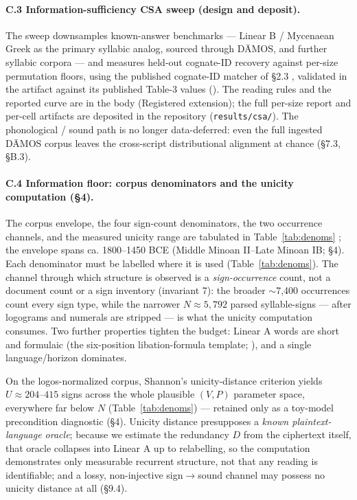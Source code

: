 \paragraph{C.3 Information-sufficiency CSA sweep (design and deposit).}
The sweep downsamples known-answer benchmarks --- Linear B /
Mycenaean Greek as the primary syllabic analog, sourced through D\=AMOS,
and further syllabic corpora --- and measures held-out cognate-ID
recovery against per-size permutation floors, using the published
cognate-ID matcher of \S2.3 \citep{tamburini2025}, validated in the
artifact against its published Table-3 values (\artref). The reading
rules and the reported curve are in the body (Registered extension); the
full per-size report and per-cell artifacts are deposited in the
repository (\texttt{results/csa/}).
The phonological / sound path is no longer data-deferred: even the full
ingested D\=AMOS corpus leaves the cross-script distributional alignment
at chance (\S7.3, \S B.3).

\paragraph{C.4 Information floor: corpus denominators and the unicity
computation (\S4).} The corpus envelope, the four
sign-count denominators, the two occurrence channels, and the measured
unicity range are tabulated in Table~\ref{tab:denoms}
\citep[Schoep 2002;][\S1--3, \S6]{salgarella2025}; the envelope spans ca.
1800--1450 BCE (Middle Minoan II--Late Minoan IB; \S4). Each denominator
must be labelled where it is used (Table~\ref{tab:denoms}). The channel through
which structure is observed is a \emph{sign-occurrence} count, not a
document count or a sign inventory (invariant 7): the broader $\sim$7,400
occurrences count every sign type, while the narrower
$N \approx 5{,}792$ parsed syllable-signs --- after logograms and
numerals are stripped --- is what the unicity computation consumes. Two
further properties tighten the budget: Linear A words are short and
formulaic (the six-position libation-formula template;
\citealp[\S7]{salgarella2025}), and a single language/horizon dominates.

On the logos-normalized corpus, Shannon's unicity-distance criterion
yields $U \approx 204$--$415$ signs across the whole plausible $(V, P)$
parameter space, everywhere far below $N$ (Table~\ref{tab:denoms}) ---
retained only as a toy-model precondition diagnostic (\S4). Unicity
distance presupposes a \emph{known plaintext-language oracle}; because we
estimate the redundancy $D$ from the ciphertext itself, that oracle
collapses into Linear A up to relabelling, so the computation
demonstrates only measurable recurrent structure, not that any reading is
identifiable; and a lossy, non-injective sign$\rightarrow$sound channel
may possess no unicity distance at all (\S9.4).

